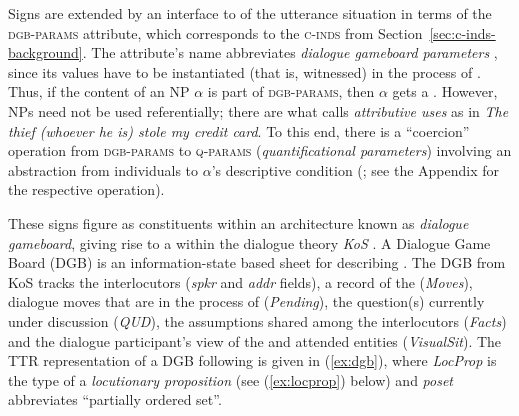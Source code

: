 \documentclass[output=paper
 	        ,biblatex
                ,babelshorthands
                ,newtxmath
                ,draftmode
                ,colorlinks, citecolor=brown
]{langscibook}
\begin{document}
Signs are extended by an interface to  of the utterance situation in terms of the \textsc{dgb-params}  attribute, which corresponds to the \textsc{c-inds} from Section~\ref{sec:c-inds-background}.
%
The attribute's name abbreviates \emph{dialogue gameboard parameters} , since its values have to be instantiated (that is, witnessed)  in the process of .
%
Thus, if the content of an NP $\alpha$ is part of \textsc{dgb-params}, then $\alpha$ gets a .
%
However, NPs need not be used referentially; there are what \citet{Donellan:1966} calls \emph{attributive uses}  as in \textit{The thief (whoever he is) stole my credit card}.
%
To this end, there is a \enquote{coercion} operation from \textsc{dgb-params} to \textsc{q-params}  (\emph{quantificational parameters})  involving an abstraction from individuals to $\alpha$'s descriptive condition (\citealt{Purver:Ginzburg:2004}; see the Appendix for the respective operation).


These \HPSGTTR signs figure as constituents within an architecture known as \emph{dialogue gameboard}, giving rise to a  within the dialogue theory \emph{KoS}
\citep{Ginzburg:1994,Ginzburg:1996,Ginzburg:2003,Ginzburg:2012}. 
%
A Dialogue Game Board (DGB) is an information-state based sheet for describing .
%
The DGB from KoS tracks the interlocutors (\textit{spkr} and \textit{addr} fields), a record of the  (\textit{Moves}), dialogue moves that are in the process of  (\textit{Pending}), the question(s) currently under discussion  (\textit{QUD}), the assumptions shared among the interlocutors (\textit{Facts}) and   the dialogue
participant's view of 
the  and attended entities (\textit{VisualSit}).
%
  
The TTR representation of a DGB following \citet{Ginzburg:2012} is given in (\ref{ex:dgb}), where \textit{LocProp} is the type of a \emph{locutionary proposition} (see (\ref{ex:locprop}) below) and \textit{poset} abbreviates \enquote{partially ordered set}.
%
\ea \label{ex:dgb}
\z
\end{document}
